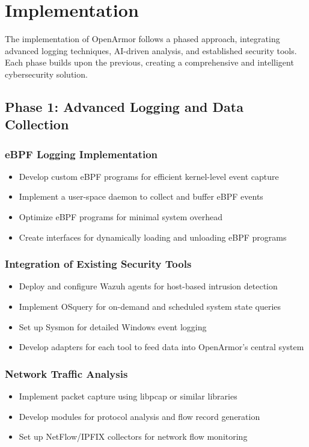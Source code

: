 \chapter{Implementation}

The implementation of OpenArmor follows a phased approach, integrating advanced logging techniques, AI-driven analysis, and established security tools. Each phase builds upon the previous, creating a comprehensive and intelligent cybersecurity solution.

\section{Phase 1: Advanced Logging and Data Collection}

\subsection{eBPF Logging Implementation}
\begin{itemize}
    \item Develop custom eBPF programs for efficient kernel-level event capture
    \item Implement a user-space daemon to collect and buffer eBPF events
    \item Optimize eBPF programs for minimal system overhead
    \item Create interfaces for dynamically loading and unloading eBPF programs
\end{itemize}

\subsection{Integration of Existing Security Tools}
\begin{itemize}
    \item Deploy and configure Wazuh agents for host-based intrusion detection
    \item Implement OSquery for on-demand and scheduled system state queries
    \item Set up Sysmon for detailed Windows event logging
    \item Develop adapters for each tool to feed data into OpenArmor's central system
\end{itemize}

\subsection{Network Traffic Analysis}
\begin{itemize}
    \item Implement packet capture using libpcap or similar libraries
    \item Develop modules for protocol analysis and flow record generation
    \item Set up NetFlow/IPFIX collectors for network flow monitoring
\end{itemize}

